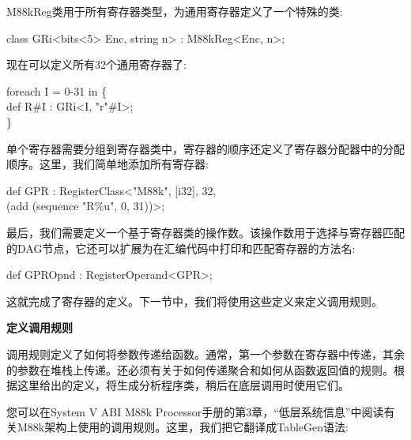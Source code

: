 M88kReg类用于所有寄存器类型，为通用寄存器定义了一个特殊的类:\par

\begin{tcolorbox}[colback=white,colframe=black]
class GRi<bits<5> Enc, string n> : M88kReg<Enc, n>;
\end{tcolorbox}

现在可以定义所有32个通用寄存器了:\par

\begin{tcolorbox}[colback=white,colframe=black]
foreach I = 0-31 in \{ \\
\hspace*{1cm}def R\#I : GRi<I, "r"\#I>; \\
\}
\end{tcolorbox}

单个寄存器需要分组到寄存器类中，寄存器的顺序还定义了寄存器分配器中的分配顺序。这里，我们简单地添加所有寄存器:\par

\begin{tcolorbox}[colback=white,colframe=black]
def GPR : RegisterClass<"M88k", [i32], 32, \\
\hspace*{4.5cm}(add (sequence "R\%u", 0, 31))>;
\end{tcolorbox}

最后，我们需要定义一个基于寄存器类的操作数。该操作数用于选择与寄存器匹配的DAG节点，它还可以扩展为在汇编代码中打印和匹配寄存器的方法名:\par

\begin{tcolorbox}[colback=white,colframe=black]
def GPROpnd : RegisterOperand<GPR>;
\end{tcolorbox}

这就完成了寄存器的定义。下一节中，我们将使用这些定义来定义调用规则。\par

\hspace*{\fill} \par %
\textbf{定义调用规则}

调用规则定义了如何将参数传递给函数。通常，第一个参数在寄存器中传递，其余的参数在堆栈上传递。还必须有关于如何传递聚合和如何从函数返回值的规则。根据这里给出的定义，将生成分析程序类，稍后在底层调用时使用它们。\par

您可以在System V ABI M88k Processor手册的第3章，“低层系统信息”中阅读有关M88k架构上使用的调用规则。这里，我们把它翻译成TableGen语法:\par

